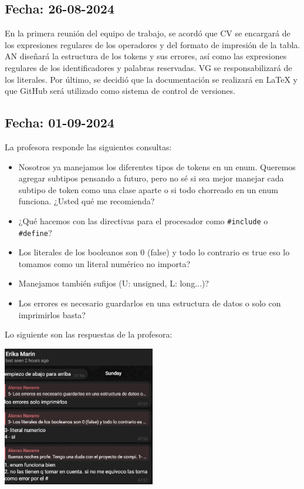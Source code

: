 \documentclass[a4paper,12pt]{article}
\begin{document}
\subsection*{Fecha: 26-08-2024}
\begin{flushleft}
    \hspace*{2em} En la primera reunión del equipo de trabajo,
    se acordó que CV se encargará de los expresiones regulares
    de los operadores y del formato de impresión de la tabla.
    AN diseñará la estructura de los tokens y sus errores, 
    así como las expresiones regulares de los identificadores
    y palabras reservadas. VG se responsabilizará de los 
    literales. Por último, se decidió que la documentación se 
    realizará en LaTeX y que GitHub será utilizado como 
    sistema de control de versiones.
\end{flushleft}

\subsection*{Fecha: 01-09-2024}
\begin{flushleft}
    La profesora responde las siguientes consultas:
    \begin{itemize}
        \item Nosotros ya manejamos los diferentes tipos de 
        tokens en un enum. Queremos agregar subtipos pensando 
        a futuro, pero no sé si sea mejor manejar cada 
        subtipo de token como una clase aparte o si todo 
        chorreado en un enum funciona. ¿Usted qué me recomienda?
        \item ¿Qué hacemos con las directivas para el procesador 
        como \texttt{\#include} o \texttt{\#define}?
        \item Los literales de los booleanos son 0 (false) y 
        todo lo contrario es true eso lo tomamos como un 
        literal numérico no importa?
        \item Manejamos también sufijos (U: unsigned, L: long...)?
        \item Los errores es necesario guardarlos en una estructura de datos o solo con imprimirlos basta?
    \end{itemize}
    Lo siguiente son las respuestas de la profesora:\par\vspace{1em}
    \centering
    \includegraphics[width=0.5\textwidth]{respuestas-1.png}\par
\end{flushleft}
\end{document}
